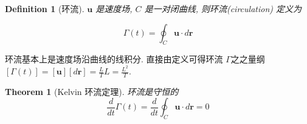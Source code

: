 \documentclass[11pt]{article}
\newtheorem{theorem}{Theorem}[subsection]
\newtheorem{definition}{Definition}[subsection]
\begin{document}
\begin{definition}[\kaishu 环流]
	$ \boldsymbol{u} $ 是速度场, $ C $ 是一对闭曲线, 则环流(circulation) 定义为
	
	\begin{equation}
	\Gamma \left( t \right) = \oint_C {\boldsymbol{u} \cdot d\boldsymbol{r}} 
	\label{eq5.3.5}
	\end{equation}
	\label{def5.3.2}
\end{definition}

环流基本上是速度场沿曲线的线积分. 直接由定义可得环流 $ \Gamma $之之量纲 $\left[ {\Gamma \left( t \right)} \right] = \left[ \boldsymbol{u} \right]\left[ {d\boldsymbol{r}} \right] = \frac{L}{T}L = \frac{{{L^2}}}{T}$. 

\begin{theorem}[\kaishu Kelvin 环流定理]
	环流是守恒的
	\begin{equation}
	\frac{d}{{dt}}\Gamma \left( t \right) = \frac{d}{{dt}}\oint_C {\boldsymbol{u} \cdot d\boldsymbol{r}}  = 0
	\label{eq5.3.6}
	\end{equation}
\end{theorem}
\end{document}
